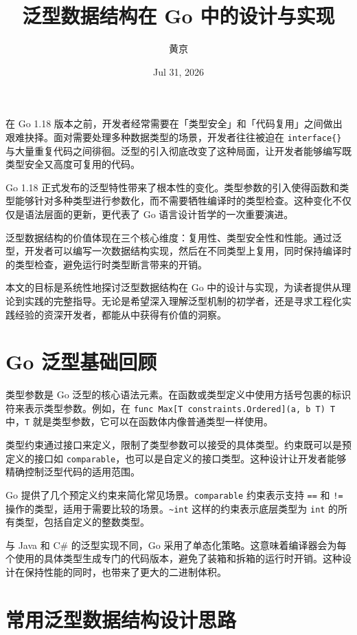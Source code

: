 \title{泛型数据结构在 Go 中的设计与实现}
\author{黄京}
\date{Jul 31, 2026}
\maketitle
在 Go 1.18 版本之前，开发者经常需要在「类型安全」和「代码复用」之间做出艰难抉择。面对需要处理多种数据类型的场景，开发者往往被迫在 \texttt{interface\{{}\}{}} 与大量重复代码之间徘徊。泛型的引入彻底改变了这种局面，让开发者能够编写既类型安全又高度可复用的代码。\par
Go 1.18 正式发布的泛型特性带来了根本性的变化。类型参数的引入使得函数和类型能够针对多种类型进行参数化，而不需要牺牲编译时的类型检查。这种变化不仅仅是语法层面的更新，更代表了 Go 语言设计哲学的一次重要演进。\par
泛型数据结构的价值体现在三个核心维度：复用性、类型安全性和性能。通过泛型，开发者可以编写一次数据结构实现，然后在不同类型上复用，同时保持编译时的类型检查，避免运行时类型断言带来的开销。\par
本文的目标是系统性地探讨泛型数据结构在 Go 中的设计与实现，为读者提供从理论到实践的完整指导。无论是希望深入理解泛型机制的初学者，还是寻求工程化实践经验的资深开发者，都能从中获得有价值的洞察。\par
\chapter{Go 泛型基础回顾}
类型参数是 Go 泛型的核心语法元素。在函数或类型定义中使用方括号包裹的标识符来表示类型参数。例如，在 \texttt{func Max[T constraints.Ordered](a, b T) T} 中，\texttt{T} 就是类型参数，它可以在函数体内像普通类型一样使用。\par
类型约束通过接口来定义，限制了类型参数可以接受的具体类型。约束既可以是预定义的接口如 \texttt{comparable}，也可以是自定义的接口类型。这种设计让开发者能够精确控制泛型代码的适用范围。\par
Go 提供了几个预定义约束来简化常见场景。\texttt{comparable} 约束表示支持 \texttt{==} 和 \texttt{!=} 操作的类型，适用于需要比较的场景。\texttt{\~{}int} 这样的约束表示底层类型为 \texttt{int} 的所有类型，包括自定义的整数类型。\par
与 Java 和 C\#{} 的泛型实现不同，Go 采用了单态化策略。这意味着编译器会为每个使用的具体类型生成专门的代码版本，避免了装箱和拆箱的运行时开销。这种设计在保持性能的同时，也带来了更大的二进制体积。\par
\chapter{常用泛型数据结构设计思路}
